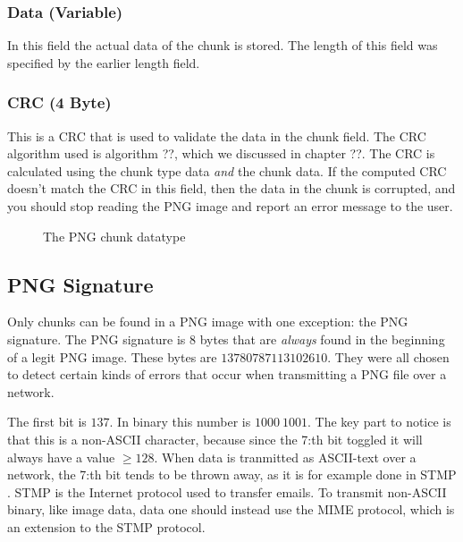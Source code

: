 
\subsubsection*{Data (Variable)}

In this field the actual data of the chunk is stored. The length of
this field was specified by the earlier length field.

\subsubsection*{CRC (4 Byte)}

This is a CRC that is used to validate the data in the chunk
field. The CRC algorithm used is algorithm ??, which we discussed in
chapter ??. The CRC is calculated using the chunk type data
\textit{and} the chunk data. If the computed CRC doesn't match the CRC
in this field, then the data in the chunk is corrupted, and you should
stop reading the PNG image and report an error message to the user.


\begin{figure}
  \centering
  \caption{The PNG chunk datatype}
  \label{fig:png-chunk}
\end{figure}

\subsection{PNG Signature}

Only chunks can be found in a PNG image with one exception: the PNG
signature. The PNG signature is 8 bytes that are \textit{always} found
in the beginning of a legit PNG image. These bytes are $137 80 78 71
13 10 26 10$. They were all chosen to detect certain kinds of errors
that occur when transmitting a PNG file over a network.

The first bit is $137$. In binary this number is $1000\ 1001$. The key
part to notice is that this is a non-ASCII character, because since
the 7:th bit toggled it will always have a value $\ge 128$. When data
is tranmitted as ASCII-text over a network, the 7:th bit tends to be
thrown away, as it is for example done in STMP \cite{rfc5321}. STMP is
 the Internet protocol used to transfer emails. To transmit non-ASCII
binary, like image data, data one should instead use the MIME
protocol, which is an extension to the STMP protocol.

